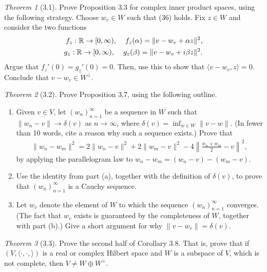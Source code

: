 \documentclass[12pt]{article}
\theoremstyle{remark}
\theoremstyle{named}
\newtheorem*{theorem}{Theorem}
\renewcommand{\a}{\alpha}
\renewcommand{\b}{\beta}
\renewcommand{\d}{\delta}
\newcommand{\R}{\mathbb R}
\begin{document}
\begin{theorem}[3.1]
    Prove Proposition 3.3 for complex inner product spaces, using the following strategy. Choose \(w_v \in W\) such that (36) holds. Fix \(z \in W\) and consider the two functions
    \begin{align*}
        f_z : \R \to [0, \infty), \hspace*{4mm} f_z(\a) = \|v - w_v + \a z\|^2, \\
        g_z : \R \to [0, \infty), \hspace*{4mm} g_z(\b) = \|v - w_v + i\b z\|^2.
    \end{align*}
    Argue that \(f_z'(0) = g_z'(0) = 0\). Then, use this to show that \(\langle v - w_v, z\rangle = 0\). Conclude that \(v - w_v \in W^\perp\).
\end{theorem}

\begin{theorem}[3.2]
    Prove Proposition 3,7, using the following outline.
    \begin{enumerate}
        \item Given \(v \in V\), let \((w_n)_{n = 1}^\infty\) be a sequence in \(W\) such that \(\|w_n - v\| \to \d(v)\) as \(n \to \infty\), where \(\d(v) = \inf_{w \in W}\|v - w\|\). (In fewer than 10 words, cite a reason why such a sequence exists.) Prove that
        \begin{align*}
            \|w_n - w_m\|^2 = 2\|w_n - v\|^2 + 2\|w_m - v\|^2 - 4 \left \| \frac{w_n + w_m}{2} - v \right \|^2,
        \end{align*}
        by applying the parallelogram law to \(w_n - w_m = (w_n - v) - (w_m - v)\).
        \item Use the identity from part (a), together with the definition of \(\d(v)\), to prove that \((w_n)_{n = 1}^\infty\) is a Cauchy sequence. 
        \item Let \(w_v\) denote the element of \(W\) to which the sequence \((w_n)_{n = 1}^\infty\) converges. (The fact that \(w_v\) exists is guaranteed by the completeness of \(W\), together with part (b).) Give a short argument for why \(\|v - w_v\| = \d(v)\).
    \end{enumerate}
\end{theorem}

\begin{theorem}[3.3]
    Prove the second half of Corollary 3.8. That is, prove that if \((V, \langle \cdot, \cdot, \rangle)\) is a real or complex Hilbert space and \(W\) is a subspace of \(V\), which is not complete, then \(V \neq W \oplus W^\perp\).
\end{theorem}
\end{document}

